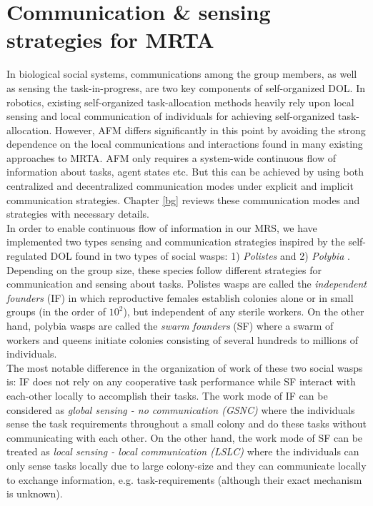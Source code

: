 \section{Communication \& sensing strategies for MRTA}
\label{intro:comm}
In biological social systems, communications among the group members, as well as sensing the task-in-progress, are two key components of self-organized DOL. In robotics, existing self-organized task-allocation methods heavily rely upon local  sensing and local communication of individuals for achieving self-organized task-allocation. However,  AFM differs significantly in this point by avoiding the strong dependence on the local communications and interactions found in many existing approaches to MRTA. AFM only requires a system-wide continuous flow of information about tasks, agent states etc. But this can be achieved by using both centralized and decentralized communication modes under explicit and implicit communication strategies. Chapter \ref{bg} reviews these communication modes and strategies with necessary details.\\
In order to enable continuous flow of information in our MRS, we have implemented two types sensing and communication strategies inspired by the self-regulated DOL found in two types of social wasps: 1) {\em Polistes} and 2)  {\em Polybia} \cite{Jeanne1999}. Depending on the group size, these species follow different strategies for  communication and sensing about tasks.   Polistes wasps are called the \textit{independent founders} (IF) in which reproductive females establish colonies alone or in small groups (in the order of $10^2$), but independent of any sterile workers. On the other hand, polybia wasps are called the \textit{swarm founders} (SF) where a swarm of workers and queens initiate colonies consisting of several hundreds to millions of individuals.\\
The most notable difference in the organization of work of these two social wasps is: IF does not rely on any cooperative task performance while SF interact with each-other locally to accomplish their tasks. The work mode of IF can be considered as {\em global sensing - no communication (GSNC)} where the individuals sense the task requirements throughout a small colony and do these tasks without communicating with each other. On the other hand, the work mode of SF can be treated as {\em local sensing - local communication (LSLC)} where the individuals can only sense tasks locally due to large colony-size and they can communicate locally to exchange information, e.g. task-requirements (although their exact mechanism is unknown).\\
